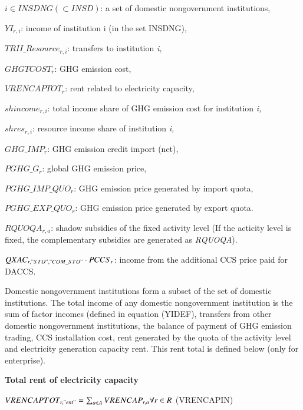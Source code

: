 \documentclass[10pt,a4paper,titlepage,dvipdfmx]{book}
\newif\ifAIMHubReviewMode
\newenvironment{changedblock}{\begingroup\ifAIMHubReviewMode\color{red}\fi}{\endgroup}
\begin{document}
\begin{flushleft}
$i\in \textit{INSDNG}\left(\subset INSD\right)$: a set of domestic nongovernment institutions,

$YI_{r,i}$: income of institution i (in the set INSDNG),

$TRII\_Resource_{r,i}$: transfers to institution \textit{i,}

$GHGTCOST_{r}$: GHG emission cost,

$VRENCAPTOT_{r}$: rent related to electricity capacity, 

$shincome_{r,i}$: total income share of GHG emission cost for institution \textit{i,}

$shres_{r,i}$: resource income share of institution \textit{i,}

$GHG\_IMP_{r}$: GHG emission credit import (net),

$PGHG\_G_{r}$: global GHG emission price,

$PGHG\_IMP\_QUO_{r}$: GHG emission price generated by import quota,

$PGHG\_EXP\_QUO_{r}$: GHG emission price generated by export quota.

$RQUOQA_{r,a}$: shadow subsidies of the fixed activity level (If the acticity level is fixed, the complementary subsidies are generated as \textit{RQUOQA}).

\begin{changedblock}
$QXAC_{r,"STO","COM\_STO"}\cdot PCCS_{r}$: income from the additional CCS price paid for DACCS.
\end{changedblock}
\end{flushleft}

Domestic nongovernment institutions form a subset of the set of domestic institutions. The total income of any domestic nongovernment institution is the sum of factor incomes (defined in equation (YIDEF), transfers from other domestic nongovernment institutions, the balance of payment of GHG emission trading, CCS installation cost, rent generated by the quota of the activity level and electricity generation capacity rent. This rent total is defined below (only for enterprise).

\begin{flushleft}\textbf{Total rent of electricity capacity}\end{flushleft}


\begin{center}$VRENCAPTOT_{r,"ent"}=\sum _{a\in A}VRENCAP_{r,a}\forall r\in R$ (VRENCAPIN)
\end{center}
\end{document}
